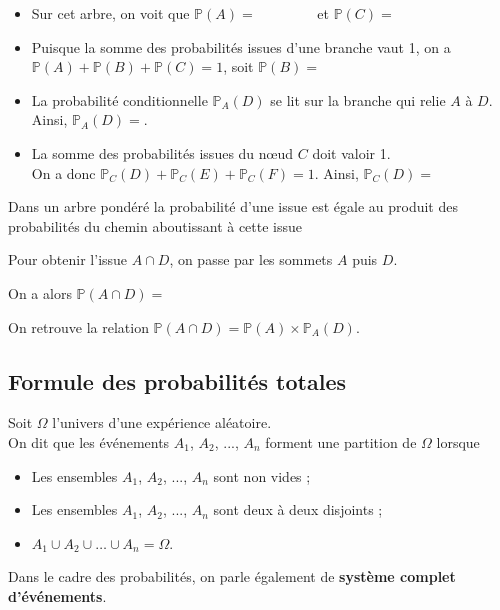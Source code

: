 \documentclass[11pt,fleqn, openany]{book} %
\begin{document}
\begin{example}
\begin{itemize}
\item Sur cet arbre, on voit que $\mathbb{P}(A)=\qquad\qquad$ et $\mathbb{P}(C)=$
\item Puisque la somme des probabilités issues d'une branche vaut 1, on a $\mathbb{P}(A)+\mathbb{P}(B)+\mathbb{P}(C)=1$, soit $\mathbb{P}(B)=$
\item La probabilité conditionnelle $\mathbb{P}_A(D)$ se lit sur la branche qui relie $A$ à $D$. Ainsi, $\mathbb{P}_A(D)=$.
\item La somme des probabilités issues du nœud $C$ doit valoir 1. \\ On a donc $\mathbb{P}_C(D)+\mathbb{P}_C(E)+\mathbb{P}_C(F)=1$. Ainsi, $\mathbb{P}_C(D)=$
\end{itemize}\end{example}


\begin{proposition} Dans un arbre pondéré la probabilité d'une issue est égale au produit des probabilités du chemin aboutissant à cette issue
\end{proposition}

\begin{example}Pour obtenir l'issue $A\cap D$, on passe par les sommets $A$ puis $D$.

On a alors $\mathbb{P}(A\cap D)=$\end{example}

On retrouve la relation $\mathbb{P}(A \cap D)= \mathbb{P}(A) \times \mathbb{P}_A(D)$.
\newpage
\subsection{Formule des probabilités totales}

\begin{definition}[Partition]Soit $\Omega$ l'univers d'une expérience aléatoire. \\On dit que les événements $A_1$, $A_2$, ..., $A_n$ forment une partition de $\Omega$ lorsque
\begin{itemize}
\item Les ensembles $A_1$, $A_2$, ..., $A_n$ sont non vides ;
\item Les ensembles $A_1$, $A_2$, ..., $A_n$ sont deux à deux disjoints ;
\item $A_1\cup A_2\cup \ldots \cup A_n = \Omega$.
\end{itemize}
Dans le cadre des probabilités, on parle également de \textbf{système complet d'événements}.\end{definition}
\end{document}
